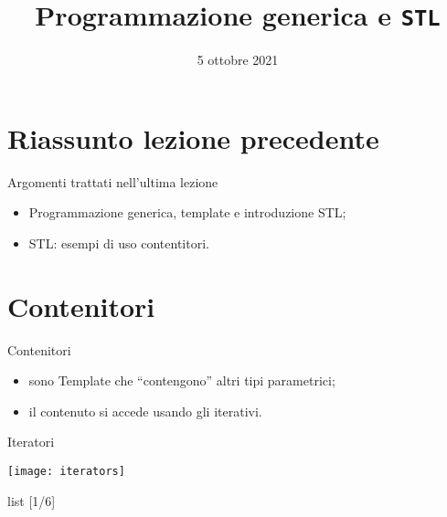 \documentclass[xcolor={dvipsnames, svgnames, x11names, table}, 10pt]{beamer}
\title{Programmazione generica e \texttt{STL}}
\date{5 ottobre 2021}
\institute{%
    \textbf{Obiettivi di apprendimento}:
    \begin{itemize}
        \item Operazioni sulle liste;
        \item TODO;
        \item TODO.
    \end{itemize}%
}
\begin{document}
\frame{\titlepage}

\section*{Riassunto lezione precedente}

\begin{frame}{Argomenti trattati nell'ultima lezione}

    \begin{itemize}
        \item Programmazione generica, template e introduzione STL;
        \item STL: esempi di uso contentitori.
    \end{itemize}

\end{frame}

\section{Contenitori}

\begin{frame}{Contenitori}

    \begin{itemize}
        \item sono Template che \enquote{contengono} altri tipi parametrici;
        \item il contenuto si accede usando gli iterativi.
    \end{itemize}

\end{frame}

\begin{frame}[c]{Iteratori}

    \texttt{[image: iterators]}

\end{frame}

\begin{frame}[label=listone, t, fragile]{list [1/6]}


\end{frame}
\end{document}
